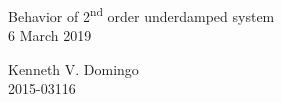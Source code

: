 \documentclass[12pt,a4paper,twoside]{article}
\begin{document}
\begin{titlepage}
\begin{center}
\vspace*{\fill}

\Huge{ Behavior of 2\textsuperscript{nd} order underdamped system \\
6 March 2019
} \\

\qquad
\qquad

\normalsize{Kenneth V. Domingo \\
2015-03116
}

\vspace*{\fill}
\end{center}
\end{titlepage}

\setcounter{page}{1}
\end{document}
